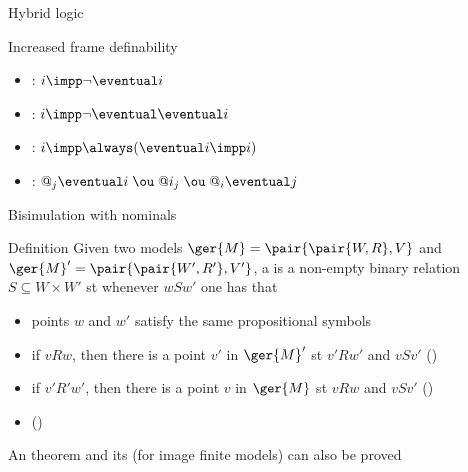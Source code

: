 \documentclass{beamer}
\begin{document}
\begin{slide}{Hybrid logic}\label{s:49}
\small

\begin{block}{Increased frame definability}
\begin{itemize}
\item {}: $i \impp \neg \eventual i$\\
\item {}: $i \impp \neg \eventual \eventual i$\\
\item {}: $i \impp \always (\eventual i \impp i)$\\
\item {}: $@_j \eventual i\; \ou\; @i_j    \; \ou\;   @_i \eventual j$
\end{itemize}
\end{block}

\end{slide}




\begin{slide}{Bisimulation with nominals}\label{s:50}
\small
\begin{block}{Definition}
Given two models $\ger{M} = \pair{\pair{W, R}, V}$ and $\ger{M}' = \pair{\pair{W', R'}, V'}$, a  is a non-empty binary relation
$S \subseteq W \times W'$  st whenever $w S w'$ one has that
\begin{itemize}
\item points $w$ and $w'$ satisfy the same propositional symbols 
\item if $v R w$, then there is a point $v'$ in $\ger{M}'$ st  $v' R w'$ and $v S v'$ \hspace{0.3cm} ()
\item if $v' R' w'$, then there is a point $v$ in $\ger{M}$ st  $v R w$ and $v S v'$ \hspace{0.3cm} ()
\item {} ()
\end{itemize}
\end{block}

An  theorem and its  (for image finite models) can also be proved

\end{slide}
\end{document}
